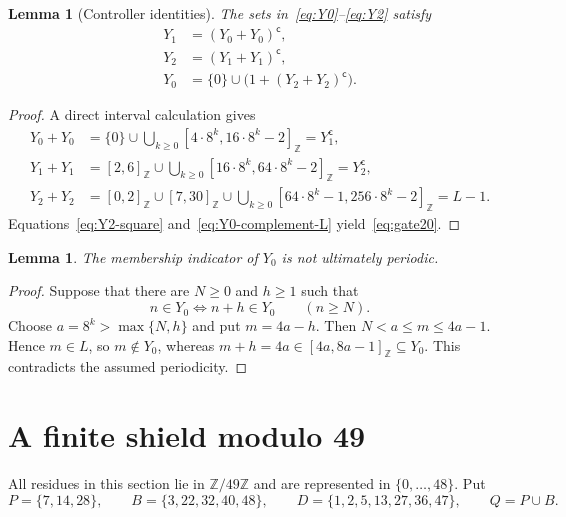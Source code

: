 \documentclass[11pt,letterpaper]{article}
\newtheorem{lemma}[theorem]{Lemma}
\newcommand{\Zfortynine}{\mathbb{Z}/49\mathbb{Z}}
\newcommand{\cpl}[1]{#1^{\mathsf{c}}}
\newcommand{\ints}[2]{[#1,#2]_{\mathbb{Z}}}
\begin{document}
\begin{lemma}[Controller identities]\label{lem:controller}
The sets in~\eqref{eq:Y0}--\eqref{eq:Y2} satisfy
\begin{align}
Y_1&=\cpl{(Y_0+Y_0)},                                      \label{eq:gate01}\\
Y_2&=\cpl{(Y_1+Y_1)},                                      \label{eq:gate12}\\
Y_0&=\{0\}\cup\bigl(1+\cpl{(Y_2+Y_2)}\bigr).             \label{eq:gate20}
\end{align}
\end{lemma}

\begin{proof}
A direct interval calculation gives
\begin{align}
Y_0+Y_0
&=\{0\}\cup\bigcup_{k\geq0}
  \ints{4\cdot8^k}{16\cdot8^k-2}=\cpl{Y_1},
  \label{eq:Y0-square}\\
Y_1+Y_1
&=\ints{2}{6}\cup\bigcup_{k\geq0}
  \ints{16\cdot8^k}{64\cdot8^k-2}=\cpl{Y_2},
  \label{eq:Y1-square}\\
Y_2+Y_2
&=\ints{0}{2}\cup\ints{7}{30}\cup\bigcup_{k\geq0}
  \ints{64\cdot8^k-1}{256\cdot8^k-2}=L-1.
  \label{eq:Y2-square}
\end{align}
Equations~\eqref{eq:Y2-square} and~\eqref{eq:Y0-complement-L} yield~\eqref{eq:gate20}.
\end{proof}

\begin{lemma}\label{lem:Y0-aperiodic}
The membership indicator of \(Y_0\) is not ultimately periodic.
\end{lemma}

\begin{proof}
Suppose that there are \(N\geq0\) and \(h\geq1\) such that
\[
n\in Y_0\iff n+h\in Y_0
\qquad(n\geq N).
\]
Choose \(a=8^k>\max\{N,h\}\) and put \(m=4a-h\). Then \(N<a\leq m\leq4a-1\). Hence \(m\in L\), so \(m\notin Y_0\), whereas \(m+h=4a\in\ints{4a}{8a-1}\subseteq Y_0\). This contradicts the assumed periodicity.
\end{proof}

\section{A finite shield modulo 49}

All residues in this section lie in \(\Zfortynine\) and are represented in \(\{0,\ldots,48\}\). Put
\begin{equation}\label{eq:PBD}
P=\{7,14,28\},\qquad B=\{3,22,32,40,48\},\qquad
D=\{1,2,5,13,27,36,47\},\qquad Q=P\cup B.
\end{equation}
\end{document}
